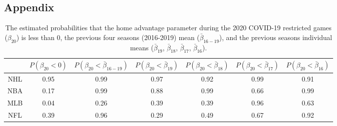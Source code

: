 \documentclass{uofsthesis-cs}
\begin{document}
\begin{appendices}

\chapter{Appendix}

\begin{table}
	\centering
	\begin{tabular}{c@{\hskip0.05in}c@{\hskip0.05in}c@{\hskip 0.05in}c@{\hskip 0.05in}c@{\hskip 0.05in}c@{\hskip 0.05in}c}
		\toprule
		& \boldmath$P(\beta_{20} < 0)$ & \boldmath$P(\beta_{20} < \bar{\beta}_{16-19})$ & \boldmath$P(\beta_{20} < \bar{\beta}_{19})$ & \boldmath$P(\beta_{20} < \bar{\beta}_{18})$ & \boldmath$P(\beta_{20} < \bar{\beta}_{17})$ & \boldmath$P(\beta_{20} < \bar{\beta}_{16})$ \\
		\midrule
		NHL&0.95&0.99&0.97&0.92&0.99&0.91 \\
		\midrule
		NBA&0.17&0.99&0.88&0.99&0.66&0.99 \\
		\midrule
		MLB&0.04&0.26&0.39&0.39&0.96&0.63 \\
		\midrule
		NFL&0.39&0.96&0.29&0.49&0.67&0.92 \\
		\bottomrule
	\end{tabular}
	\caption{The estimated probabilities that the home advantage parameter during the 2020 COVID-19 restricted games ($\beta_{20}$) is less than 0, the previous four seasons (2016-2019) mean ($\bar{\beta}_{16-19}$), and the previous seasons individual means ($\bar{\beta}_{19}$, $\bar{\beta}_{18}$, $\bar{\beta}_{17}$, $\bar{\beta}_{16}$).}\label{tab:ha_probs}
\end{table}


\end{appendices}
\end{document}
